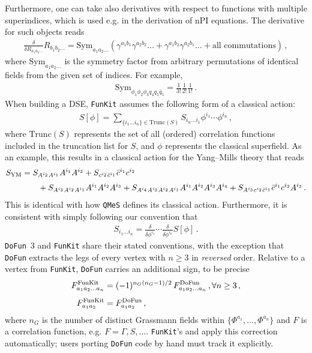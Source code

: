 \documentclass[preprint,10pt,sort&compress]{elsarticle}
\newcommand{\mathem}{\mmaInlineCell{Code}}
\newcommand{\FunKit}{\texttt{FunKit}\xspace}
\newcommand{\QMeS}{\texttt{QMeS}\xspace}
\newcommand{\DoFun}{\texttt{DoFun}\xspace}
\begin{document}
Furthermore, one can take also derivatives with respect to functions with multiple superindices, which is used e.g. in the derivation of nPI equations. The derivative for such objects reads
%
\begin{align}
	\frac{\delta}{\delta R_{a_1a_2\ldots}} R_{b_1b_2\ldots} =
	\textrm{Sym}_{a_1a_2\ldots}\left(
	\gamma^{a_1b_1}\gamma^{a_2b_2}\ldots
	+ \gamma^{a_1b_2}\gamma^{a_2b_1}\ldots
	+ \textrm{all commutations}
	\right)\,,
	\label{eq:symDeriv}
\end{align}
%
where $\textrm{Sym}_{a_1a_2\ldots}$ is the symmetry factor from arbitrary permutations of identical fields from the given set of indices. For example,
%
\begin{align}
	\textrm{Sym}_{\phi_1\phi_2\phi_3q_4q_5\bar{q}_5} = \frac{1}{3!}\frac{1}{2!}\frac{1}{1!}\,.
\end{align}
%
When building a DSE, \FunKit assumes the following form of a classical action:
%
\begin{align}
	S[\phi] = \sum_{\{i_1\ldots i_n\} \in \text{Trunc}(S)} S_{i_n\ldots i_1} \phi^{i_1}\cdots\phi^{i_n}\,,
\end{align}
%
where $\text{Trunc}(S)$ represents the set of all (ordered) correlation functions included in the truncation list for $S$, and $\phi$ represents the classical superfield.
As an example, this results in a classical action for the Yang--Mills theory that reads
%
\begin{align}
	S_\textrm{YM} &= S_{A^{i_2}A^{i_1}}A^{i_1}A^{i_2} + S_{c^{i_2}\bar{c}^{i_1}}\bar{c}^{i_1}c^{i_2}
	\notag\\[0.5ex]
	&\qquad + S_{A^{i_3}A^{i_2}A^{i_1}}A^{i_1}A^{i_2}A^{i_3} + S_{A^{i_4}A^{i_3}A^{i_2}A^{i_1}}A^{i_1}A^{i_2}A^{i_3}A^{i_4} + S_{A^{i_3}c^{i_2}\bar{c}^{i_1}}\bar{c}^{i_1}c^{i_2}A^{i_3}\,.
\end{align}
%
This is identical with how \QMeS defines its classical action. Furthermore, it is consistent with simply following our convention that
%
\begin{align}
	S_{i_1\ldots i_n} = \frac{\delta}{\delta\phi^{i_1}}\cdots\frac{\delta}{\delta\phi^{i_n}}S[\phi]\,.
\end{align}
%
\DoFun~3 \cite{Huber:2019dkb} and \FunKit{} share their stated conventions, with the exception that \DoFun{} extracts the legs of every vertex  with $n\ge 3$ in \emph{reversed} order. Relative to a vertex from \FunKit, \DoFun carries an additional sign, to be precise
%
\begin{align}
	F_{a_1a_2\ldots a_n}^\textrm{FunKit} &= (-1)^{n_G(n_G-1)/2}\, F_{a_1a_2\ldots a_n}^\textrm{DoFun}\,,\forall n \geq 3\,,
	\notag\\[1ex]
	F_{a_1a_2}^\textrm{FunKit} &= F_{a_1a_2}^\textrm{DoFun}\,,
\end{align}
%
where $n_G$ is the number of distinct Grassmann fields within $\{\Phi^{a_1},\ldots,\Phi^{a_n}\}$ and $F$ is a correlation function, e.g. $F=\Gamma,S,\ldots$.
\FunKit's \mathem{\mmaDef{FunKitForm}} and \mathem{\mmaDef{DoFunForm}} apply this correction automatically; users porting \DoFun{} code by hand must track it explicitly.
\end{document}
